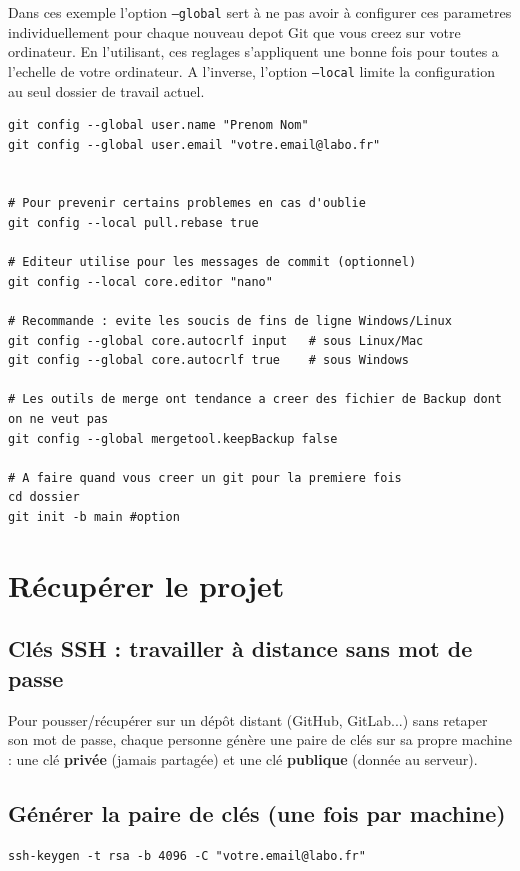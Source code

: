 \documentclass[11pt,a4paper]{article}
\begin{document}
Dans ces exemple l'option \texttt{--global} sert à ne pas avoir à configurer ces parametres individuellement pour chaque nouveau depot Git que vous creez sur votre ordinateur. En l'utilisant, ces reglages s'appliquent une bonne fois pour toutes a l'echelle de votre ordinateur. A l'inverse, l'option \texttt{--local} limite la configuration au seul dossier de travail actuel.
\begin{lstlisting}[style=bashstyle]
git config --global user.name "Prenom Nom"
git config --global user.email "votre.email@labo.fr"


# Pour prevenir certains problemes en cas d'oublie
git config --local pull.rebase true

# Editeur utilise pour les messages de commit (optionnel)
git config --local core.editor "nano"

# Recommande : evite les soucis de fins de ligne Windows/Linux
git config --global core.autocrlf input   # sous Linux/Mac
git config --global core.autocrlf true    # sous Windows

# Les outils de merge ont tendance a creer des fichier de Backup dont on ne veut pas
git config --global mergetool.keepBackup false

# A faire quand vous creer un git pour la premiere fois
cd dossier
git init -b main #option 
\end{lstlisting}

\section{Récupérer le projet}
\subsection{Clés SSH : travailler à distance sans mot de passe}

Pour pousser/récupérer sur un dépôt distant (GitHub, GitLab...) sans retaper son mot de passe, chaque personne génère une paire de clés sur sa propre machine : une clé \textbf{privée} (jamais partagée) et une clé \textbf{publique} (donnée au serveur).

\subsection*{Générer la paire de clés (une fois par machine)}

\begin{lstlisting}[style=bashstyle]
ssh-keygen -t rsa -b 4096 -C "votre.email@labo.fr"
\end{lstlisting}
\end{document}
